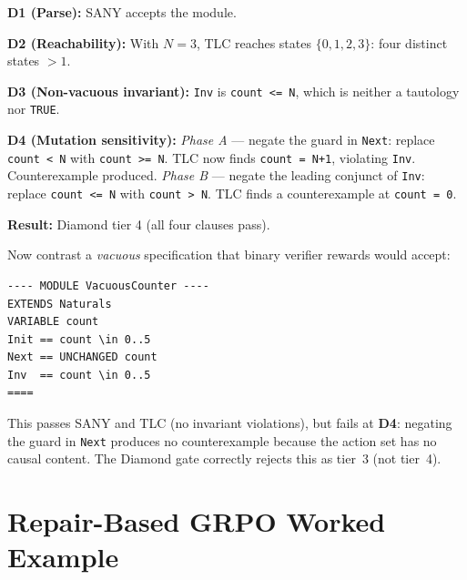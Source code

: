 \documentclass[11pt]{article}
\begin{document}
\noindent \textbf{D1 (Parse):} SANY accepts the module. \checkmark

\noindent \textbf{D2 (Reachability):} With $N=3$, TLC reaches states
$\{0, 1, 2, 3\}$: four distinct states $> 1$. \checkmark

\noindent \textbf{D3 (Non-vacuous invariant):} \texttt{Inv} is
\texttt{count <= N}, which is neither a tautology nor \texttt{TRUE}.
\checkmark

\noindent \textbf{D4 (Mutation sensitivity):}
\emph{Phase A} --- negate the guard in \texttt{Next}: replace
\texttt{count < N} with \texttt{count >= N}. TLC now finds
\texttt{count = N+1}, violating \texttt{Inv}. Counterexample produced.
\emph{Phase B} --- negate the leading conjunct of \texttt{Inv}: replace
\texttt{count <= N} with \texttt{count > N}. TLC finds a
counterexample at \texttt{count = 0}. \checkmark

\noindent \textbf{Result:} Diamond tier 4 (all four clauses pass).

\medskip
\noindent Now contrast a \emph{vacuous} specification that binary
verifier rewards would accept:

\begin{tcolorbox}[
  enhanced, colback=c4!8, colframe=c4, boxrule=0.5pt,
  arc=2pt, left=6pt, right=6pt, top=3pt, bottom=3pt,
  title=\textbf{Vacuous counter (fails Diamond gate)}, fonttitle=\small,
]
\begin{verbatim}
---- MODULE VacuousCounter ----
EXTENDS Naturals
VARIABLE count
Init == count \in 0..5
Next == UNCHANGED count
Inv  == count \in 0..5
====
\end{verbatim}
\end{tcolorbox}

\noindent This passes SANY and TLC (no invariant violations), but fails
at \textbf{D4}: negating the guard in \texttt{Next} produces no
counterexample because the action set has no causal content. The Diamond
gate correctly rejects this as tier~3 (not tier~4).

\section{Repair-Based GRPO Worked Example}
\label{app:repair-example}
\end{document}
